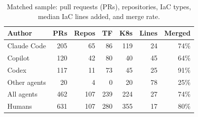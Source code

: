 \begin{table}[t]\centering\caption{Matched sample: pull requests (PRs), repositories, IaC types, median IaC lines added, and merge rate.}\label{tab:dataset}\small\begin{tabular}{@{}lrrrrrr@{}}\toprule Author & PRs & Repos & TF & K8s & Lines & Merged\\\midrule
Claude Code & 205 & 65 & 86 & 119 & 24 & 74\% \\
Copilot & 120 & 42 & 80 & 40 & 45 & 64\% \\
Codex & 117 & 11 & 73 & 45 & 25 & 91\% \\
Other agents & 20 & 4 & 0 & 20 & 78 & 25\% \\
\midrule
All agents & 462 & 107 & 239 & 224 & 27 & 74\% \\
Humans & 631 & 107 & 280 & 355 & 17 & 80\% \\
\bottomrule\end{tabular}\end{table}
